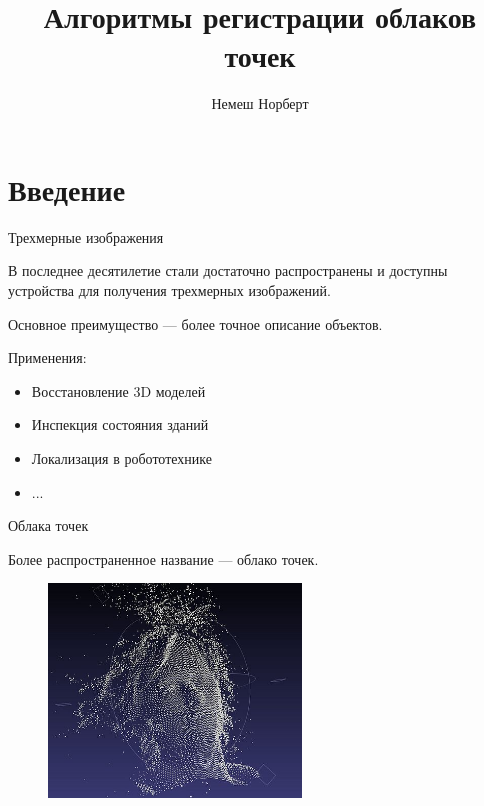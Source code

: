 \documentclass[6pt,pdf,utf8,russian]{beamer}
\title{Алгоритмы регистрации облаков точек}
\author{Немеш Норберт}
\begin{document}
\maketitle

\section{Введение}

\begin{frame}[fragile]{Трехмерные изображения}
    \begin{block}{}
        В последнее десятилетие стали достаточно распространены и доступны
        устройства для получения трехмерных изображений.
    \end{block}

    \pause

    \begin{block}{}
        Основное преимущество --- более точное описание объектов.
    \end{block}

    \pause

    \begin{block}{}
        Применения:
        \begin{itemize}
            \item Восстановление 3D моделей
            \item Инспекция состояния зданий
            \item Локализация в робототехнике
            \item ...
        \end{itemize}
    \end{block}
\end{frame}

\begin{frame}[fragile]{Облака точек}
    \begin{block}{}
        Более распространенное название --- облако точек.
    \end{block}

    \pause

    \begin{figure}
        \includegraphics[width=0.6\textwidth]{images/point_cloud_example.jpg}
    \end{figure}

\end{frame}
\end{document}
